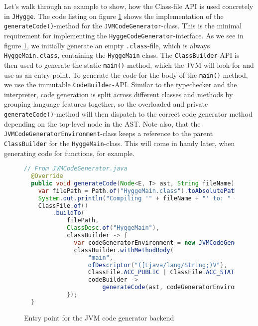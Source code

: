 Let's walk through an example to show, how the Class-file API is used concretely in \texttt{JHygge}. The code listing on figure \ref{fig:codegen_main} shows
the implementation of the \texttt{generateCode()}-method for the \texttt{JVMCodeGenerator}-class. This is the minimal requirement
for implementing the \texttt{HyggeCodeGenerator}-interface. As we see in figure \ref{fig:codegen_main}, we initially generate an empty \texttt{.class}-file,
which is always \texttt{HyggeMain.class}, containing the \texttt{HyggeMain} class. The \texttt{ClassBuilder}-API is then used to
generate the static \texttt{main()}-method, which the JVM will look for and use as an entry-point. To generate the code for
the body of the \texttt{main()}-method, we use the immutable \texttt{CodeBuilder}-API. Similar to the typechecker and the interpreter,
code generation is split across different classes and methods by grouping language features together, so the overloaded and private
\texttt{generateCode()}-method will then dispatch to the correct code generator method depending on the top-level node in the AST.
Note also, that the \texttt{JVMCodeGeneratorEnvironment}-class keeps a reference to the parent \texttt{ClassBuilder} for the
\texttt{HyggeMain}-class. This will come in handy later, when generating code for functions, for example.

\begin{figure}[H]
\centering 
\begin{lstlisting}[language=Java]
  // From JVMCodeGenerator.java
  @Override
  public void generateCode(Node<E, T> ast, String fileName) throws IOException {
    var filePath = Path.of("HyggeMain.class").toAbsolutePath();
    System.out.println("Compiling '" + fileName + "' to: " + filePath);
    ClassFile.of()
        .buildTo(
            filePath,
            ClassDesc.of("HyggeMain"),
            classBuilder -> {
              var codeGeneratorEnvironment = new JVMCodeGeneratorEnvironment(classBuilder);
              classBuilder.withMethodBody(
                  "main",
                  ofDescriptor("([Ljava/lang/String;)V"),
                  ClassFile.ACC_PUBLIC | ClassFile.ACC_STATIC,
                  codeBuilder ->
                      generateCode(ast, codeGeneratorEnvironment, codeBuilder).return_());
            });
  }
\end{lstlisting}
\caption{Entry point for the JVM code generator backend}
\label{fig:codegen_main}
\end{figure}

